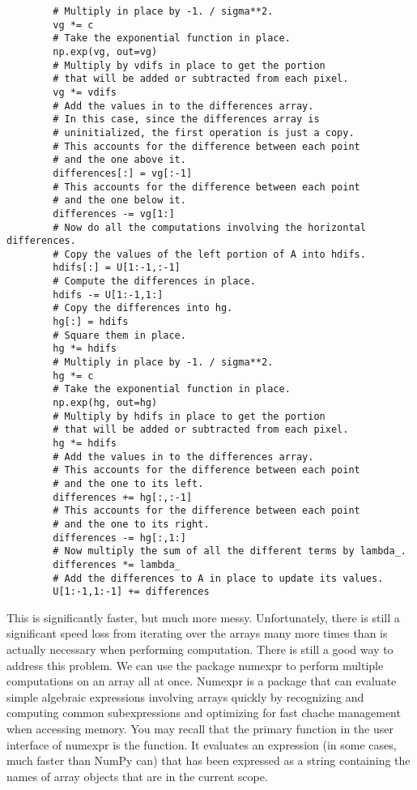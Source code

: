 \begin{lstlisting}
        # Multiply in place by -1. / sigma**2.
        vg *= c
        # Take the exponential function in place.
        np.exp(vg, out=vg)
        # Multiply by vdifs in place to get the portion
        # that will be added or subtracted from each pixel.
        vg *= vdifs
        # Add the values in to the differences array.
        # In this case, since the differences array is
        # uninitialized, the first operation is just a copy.
        # This accounts for the difference between each point
        # and the one above it.
        differences[:] = vg[:-1]
        # This accounts for the difference between each point
        # and the one below it.
        differences -= vg[1:]
        # Now do all the computations involving the horizontal differences.
        # Copy the values of the left portion of A into hdifs.
        hdifs[:] = U[1:-1,:-1]
        # Compute the differences in place.
        hdifs -= U[1:-1,1:]
        # Copy the differences into hg.
        hg[:] = hdifs
        # Square them in place.
        hg *= hdifs
        # Multiply in place by -1. / sigma**2.
        hg *= c
        # Take the exponential function in place.
        np.exp(hg, out=hg)
        # Multiply by hdifs in place to get the portion
        # that will be added or subtracted from each pixel.
        hg *= hdifs
        # Add the values in to the differences array.
        # This accounts for the difference between each point
        # and the one to its left.
        differences += hg[:,:-1]
        # This accounts for the difference between each point
        # and the one to its right.
        differences -= hg[:,1:]
        # Now multiply the sum of all the different terms by lambda_.
        differences *= lambda_
        # Add the differences to A in place to update its values.
        U[1:-1,1:-1] += differences
\end{lstlisting}
This is significantly faster, but much more messy.
Unfortunately, there is still a significant speed loss from iterating over the arrays many more times than is actually necessary when performing computation.
There is still a good way to address this problem.
We can use the package numexpr to perform multiple computations on an array all at once.
Numexpr is a package that can evaluate simple algebraic expressions involving arrays quickly by recognizing and computing common subexpressions and optimizing for fast chache management when accessing memory.
You may recall that the primary function in the user interface of numexpr is the  function.
It evaluates an expression (in some cases, much faster than NumPy can) that has been expressed as a string containing the names of array objects that are in the current scope.
